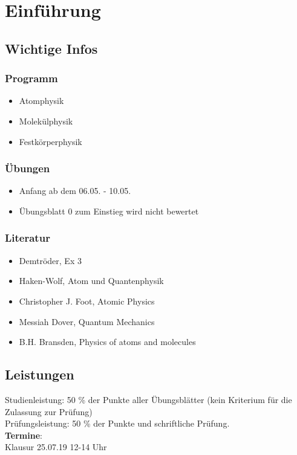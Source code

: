 \setcounter{chapter}{-1}

\chapter{Einführung}

\section{Wichtige Infos}

\subsection{Programm}

\begin{itemize}
	\item Atomphysik
	\item Molekülphysik
	\item Festkörperphysik
\end{itemize}

\subsection{Übungen}

\begin{itemize}
	\item Anfang ab dem 06.05. - 10.05.
	\item Übungsblatt 0 zum Einstieg wird nicht bewertet
\end{itemize}

\subsection{Literatur}

\begin{itemize}
	\item Demtröder, Ex 3
	\item Haken-Wolf, Atom und Quantenphysik
	\item Christopher J. Foot, Atomic Physics
	\item Messiah Dover, Quantum Mechanics
	\item B.H. Bransden, Physics of atoms and molecules
\end{itemize}

\section{Leistungen}

Studienleistung: 50 \% der Punkte aller Übungsblätter (kein Kriterium für die Zulassung zur Prüfung)\\[5pt]
Prüfungsleistung: 50 \% der Punkte und schriftliche Prüfung.\\[10pt]
\textbf{Termine}:\\
Klausur 25.07.19 12-14 Uhr\\

